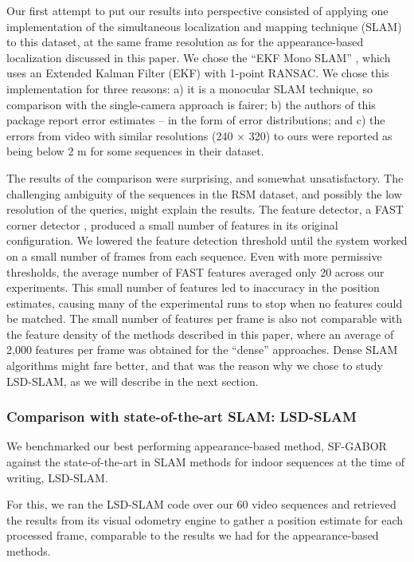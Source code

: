 Our first attempt to put our results into perspective consisted of applying one implementation of the simultaneous localization and mapping technique (SLAM) to this dataset, at the same frame resolution as for the appearance-based  localization discussed in this paper. We chose the ``EKF Mono SLAM'' \citep{Civera}, which uses an Extended Kalman Filter (EKF) with 1-point RANSAC.  We chose this implementation for three reasons: a) it is a monocular SLAM technique, so comparison with the single-camera approach is fairer; b) the authors of this package report error estimates -- in the form of error distributions; and c) the errors from video with similar resolutions (240 $\times$ 320) to ours were reported as being below 2 m for some sequences \citep{Civera} in their dataset.

The results of the comparison were surprising, and somewhat unsatisfactory. The challenging ambiguity of the sequences in the RSM dataset, and possibly the low resolution of the queries, might explain the results. The feature detector, a FAST corner detector \citep{rosten_2006_machine}, produced a small number of features in its original  configuration. We lowered the feature detection threshold until the system worked on a small number of frames from each sequence. Even with more permissive thresholds, the average number of FAST features averaged only 20 across our experiments. This small number of features led to inaccuracy in the position estimates, causing many of the experimental runs to stop when no features could be matched. The small number of features per frame is also not comparable with the feature density of the methods described in this paper, where an average of 2,000 features per frame was obtained for the ``dense'' approaches. Dense SLAM algorithms might fare better, and that was the reason why we chose to study LSD-SLAM, as we will describe in the next section.

\subsubsection{Comparison with state-of-the-art SLAM: LSD-SLAM}
\label{sec:comparisonSLAM}

We benchmarked our best performing appearance-based method, SF-GABOR against the state-of-the-art in SLAM methods for indoor sequences at the time of writing, LSD-SLAM.

For this, we ran the LSD-SLAM code over our 60 video sequences and retrieved the results from its visual odometry engine to gather a position estimate for each processed frame, comparable to the results we had for the appearance-based methods. 

